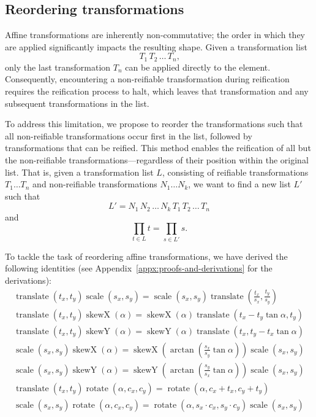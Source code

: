 \subsection{Reordering transformations} \label{reordering-transformations}

Affine transformations are inherently non-commutative; the order in which they are applied significantly impacts the resulting shape. Given a transformation list
\[
    T_1\, T_2\, \ldots\, T_n\text{,}
\]
only the last transformation $T_n$ can be applied directly to the element. Consequently, encountering a non-reifiable transformation during reification requires the reification process to halt, which leaves that transformation and any subsequent transformations in the list.

To address this limitation, we propose to reorder the transformations such that all non-reifiable transformations occur first in the list, followed by transformations that can be reified. This method enables the reification of all but the non-reifiable transformations---regardless of their position within the original list. That is, given a transformation list $L$, consisting of reifiable transformations $T_1 \ldots T_n$ and non-reifiable transformations $N_1 \ldots N_k$, we want to find a new list $L'$ such that
\[
    L' = N_1\,N_2\,\ldots\,N_k\,T_1\,T_2\,\ldots\,T_n
\]
and
\[
    \prod_{t \in L}{t} = \prod_{s \in L'}{s}\text{.}
\]

To tackle the task of reordering affine transformations, we have derived the following identities (see Appendix~\ref{appx:proofs-and-derivations} for the derivations):
\begin{gather}
    \operatorname{translate}\left(t_x, t_y\right)\operatorname{scale}\left(s_x, s_y\right) = \operatorname{scale}\left(s_x, s_y\right)\operatorname{translate}\left(\frac{t_x}{s_x}, \frac{t_y}{s_y}\right) \\
    \operatorname{translate}\left(t_x, t_y\right)\operatorname{skewX}(\alpha) = \operatorname{skewX}(\alpha)\operatorname{translate}\left(t_x - t_y \tan{\alpha}, t_y\right) \\
    \operatorname{translate}\left(t_x, t_y\right)\operatorname{skewY}(\alpha) = \operatorname{skewY}(\alpha)\operatorname{translate}\left(t_x, t_y - t_x\tan{\alpha}\right) \\
    \operatorname{scale}\left(s_x, s_y\right)\operatorname{skewX}(\alpha) = \operatorname{skewX}\left(\arctan\left(\frac{s_x}{s_y} \tan{\alpha}\right)\right)\operatorname{scale}\left(s_x, s_y\right) \\
    \operatorname{scale}\left(s_x, s_y\right)\operatorname{skewY}(\alpha) = \operatorname{skewY}\left(\arctan\left(\frac{s_y}{s_x} \tan{\alpha}\right)\right)\operatorname{scale}\left(s_x, s_y\right) \\
    \operatorname{translate}\left(t_x, t_y\right)\operatorname{rotate}\left(\alpha, c_x, c_y\right) = \operatorname{rotate}\left(\alpha, c_x + t_x, c_y + t_y\right) \\
    \operatorname{scale}\left(s_x, s_y\right)\operatorname{rotate}\left(\alpha, c_x, c_y\right) = \operatorname{rotate}\left(\alpha, s_x \cdot c_x, s_y \cdot c_y\right)\operatorname{scale}\left(s_x, s_y\right)
\end{gather}

